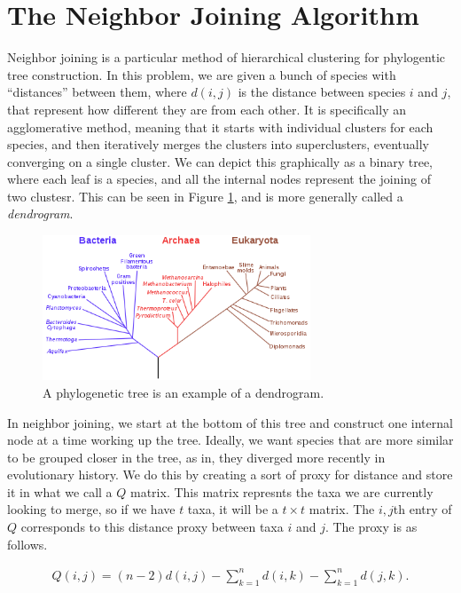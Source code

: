 \section{The Neighbor Joining Algorithm}

Neighbor joining is a particular method of hierarchical clustering for phylogentic tree construction. In this problem, we are given a bunch of species with ``distances'' between them, where $d(i,j)$ is the distance between species $i$ and $j$, that represent how different they are from each other. It is specifically an agglomerative method, meaning that it starts with individual clusters for each species, and then iteratively merges the clusters into superclusters, eventually converging on a single cluster. We can depict this graphically as a binary tree, where each leaf is a species, and all the internal nodes represent the joining of two clustesr. This can be seen in Figure \ref{tree}, and is more generally called a {\em dendrogram}.

\begin{figure}[h!]\label{tree}
  \caption{A phylogenetic tree is an example of a dendrogram.}
  \begin{center}
    \includegraphics[width=8cm]{phylogenetictree.png}
  \end{center}
\end{figure}

In neighbor joining, we start at the bottom of this tree and construct one internal node at a time working up the tree. Ideally, we want species that are more similar to be grouped closer in the tree, as in, they diverged more recently in evolutionary history. We do this by creating a sort of proxy for distance and store it in what we call a $Q$ matrix. This matrix represnts the taxa we are currently looking to merge, so if we have $t$ taxa, it will be a $t\times t$ matrix. The $i,j$th entry of $Q$ corresponds to this distance proxy between taxa $i$ and $j$. The proxy is as follows.

\begin{align}\label{qformula}
Q(i,j) = (n-2)d(i,j) -\sum_{k=1}^n d(i,k) - \sum_{k=1}^n d(j,k).
\end{align}


